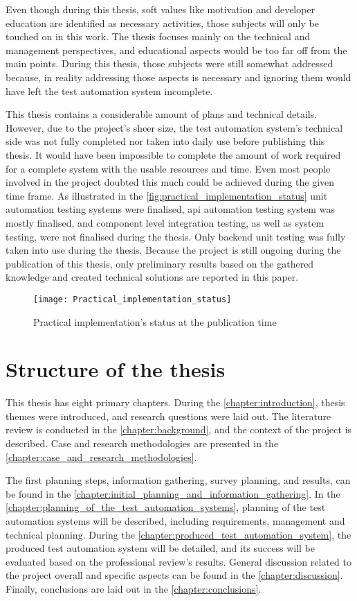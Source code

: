 Even though during this thesis, soft values like motivation and developer education are identified as necessary activities, those subjects will only be touched on in this work. The thesis focuses mainly on the technical and management perspectives, and educational aspects would be too far off from the main points. During this thesis, those subjects were still somewhat addressed because, in reality addressing those aspects is necessary and ignoring them would have left the test automation system incomplete.

This thesis contains a considerable amount of plans and technical details. However, due to the project's sheer size, the test automation system's technical side was not fully completed nor taken into daily use before publishing this thesis. It would have been impossible to complete the amount of work required for a complete system with the usable resources and time. Even most people involved in the project doubted this much could be achieved during the given time frame. As illustrated in the \autoref{fig:practical_implementation_status} unit automation testing systems were finalised, \gls{api} automation testing system was mostly finalised, and component level integration testing, as well as system testing, were not finalised during the thesis. Only backend unit testing was fully taken into use during the thesis. Because the project is still ongoing during the publication of this thesis, only preliminary results based on the gathered knowledge and created technical solutions are reported in this paper.

\begin{figure}
	\texttt{[image: Practical\_implementation\_status]}
	\caption{Practical implementation's status at the publication time}
	\label{fig:practical_implementation_status}
\end{figure}
\FloatBarrier

\section{Structure of the thesis}
This thesis has eight primary chapters. During the \autoref{chapter:introduction}, thesis themes were introduced, and research questions were laid out. The literature review is conducted in the \autoref{chapter:background}, and the context of the project is described. Case and research methodologies are presented in the \autoref{chapter:case_and_research_methodologies}.

The first planning steps, information gathering, survey planning, and results, can be found in the \autoref{chapter:initial_planning_and_information_gathering}. In the \autoref{chapter:planning_of_the_test_automation_systems}, planning of the test automation systems will be described, including requirements, management and technical planning. During the \autoref{chapter:produced_test_automation_system}, the produced test automation system will be detailed, and its success will be evaluated based on the professional review's results. General discussion related to the project overall and specific aspects can be found in the \autoref{chapter:discussion}. Finally, conclusions are laid out in the \autoref{chapter:conclusions}.